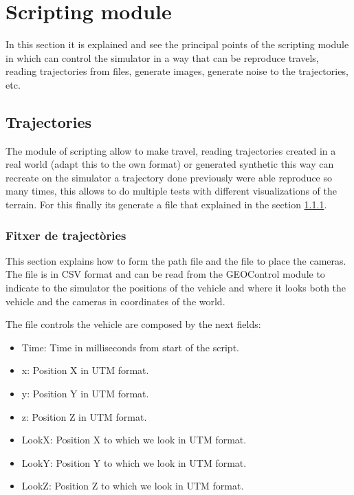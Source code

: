 \documentclass[10pt,a4paper,twocolumn,twoside]{article}
\begin{document}
\section{Scripting module}
\label{modulescript}

In this section it is explained and see the principal points of the scripting module in which can control the simulator in a way that can be reproduce travels, reading trajectories from files, generate images, generate noise to the trajectories, etc.

\subsection{Trajectories}
The module of scripting allow to make travel, reading trajectories created in a real world (adapt this to the own format) or generated synthetic this way can recreate on the simulator a trajectory done previously were able reproduce so many times, this allows to do multiple tests with different visualizations of the terrain. For this finally its generate a file that explained in the section \ref{file-trajectories}.

\subsubsection{Fitxer de trajectòries}
\label{file-trajectories}
This section explains how to form the path file and the file to place the cameras. The file is in CSV format and can be read from the GEOControl module to indicate to the simulator the positions of the vehicle and where it looks both the vehicle and the cameras in coordinates of the world.

The file controls the vehicle are composed by the next fields:

\begin{itemize}
\item Time: Time in milliseconds from start of the script.
\item x: Position X in UTM format.
\item y: Position Y in UTM format.
\item z: Position Z in UTM format.
\item LookX: Position X to which we look in UTM format.
\item LookY: Position Y to which we look in UTM format.
\item LookZ: Position Z to which we look in UTM format.
\end{itemize}
\end{document}
